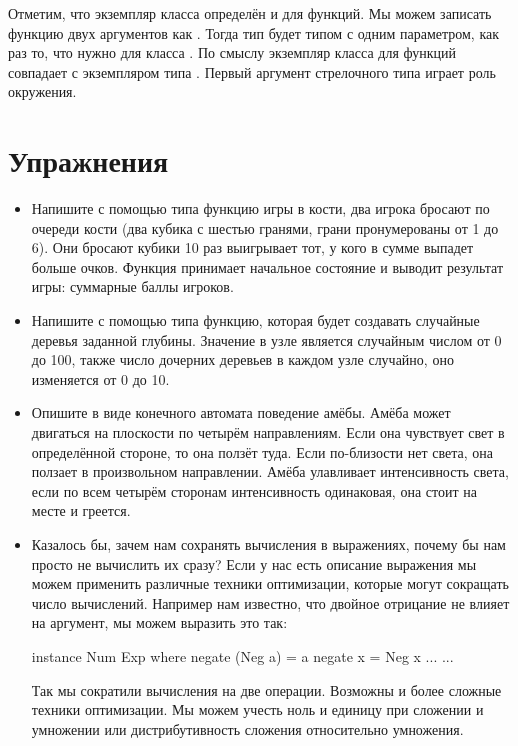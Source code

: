 Отметим, что экземпляр класса  определён и для функций. Мы
можем записать функцию двух аргументов  как
. Тогда тип  будет типом с одним
параметром, как раз то, что нужно для класса . По смыслу
экземпляр класса  для функций совпадает с экземпляром типа
. Первый аргумент стрелочного типа  играет роль
окружения.

\section{Упражнения}

\begin{itemize}
\item
  Напишите с помощью типа  функцию игры в кости, два игрока
  бросают по очереди кости (два кубика с шестью гранями, грани
  пронумерованы от 1 до 6). Они бросают кубики 10 раз выигрывает тот, у
  кого в сумме выпадет больше очков. Функция принимает начальное
  состояние и выводит результат игры: суммарные баллы игроков.
\item
  Напишите с помощью типа  функцию, которая будет создавать
  случайные деревья заданной глубины. Значение в узле является случайным
  числом от 0 до 100, также число дочерних деревьев в каждом узле
  случайно, оно изменяется от 0 до 10.
\item
  Опишите в виде конечного автомата поведение амёбы. Амёба может
  двигаться на плоскости по четырём направлениям. Если она чувствует
  свет в определённой стороне, то она ползёт туда. Если по-близости нет
  света, она ползает в произвольном направлении. Амёба улавливает
  интенсивность света, если по всем четырём сторонам интенсивность
  одинаковая, она стоит на месте и греется.
\item
  Казалось бы, зачем нам сохранять вычисления в выражениях, почему бы
  нам просто не вычислить их сразу? Если у нас есть описание выражения
  мы можем применить различные техники оптимизации, которые могут
  сокращать число вычислений. Например нам известно, что двойное
  отрицание не влияет на аргумент, мы можем выразить это так:


  \begin{code}
  instance Num Exp where
      negate (Neg a)  = a
      negate x        = Neg x
      ...
      ...
  \end{code}

  Так мы сократили вычисления на две операции. Возможны и более сложные
  техники оптимизации. Мы можем учесть ноль и единицу при сложении и
  умножении или дистрибутивность сложения относительно умножения.


\end{itemize}
